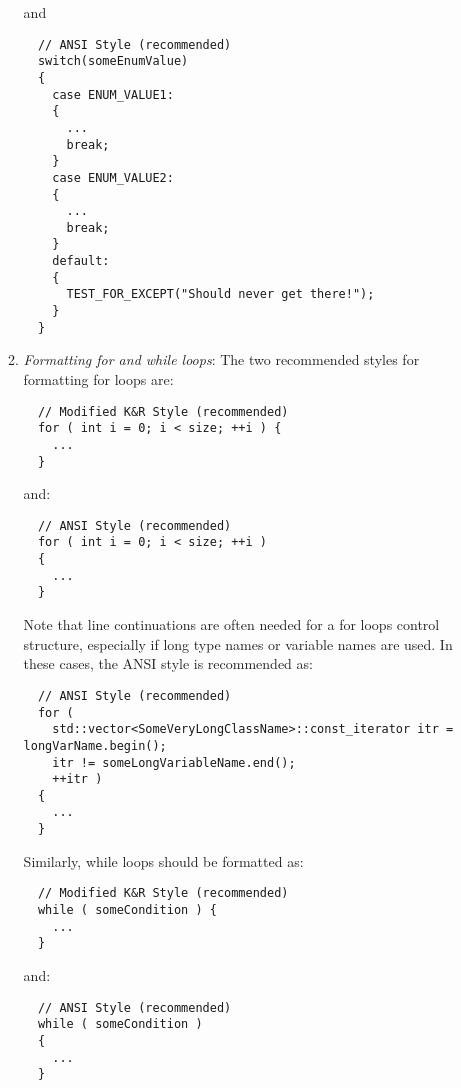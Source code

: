 \begin{enumerate}
\begin{enumerate}
  {}\noindent{}and

  {\small\begin{verbatim}
  // ANSI Style (recommended)
  switch(someEnumValue)
  {
    case ENUM_VALUE1:
    {
      ...
      break;
    }
    case ENUM_VALUE2:
    {
      ...
      break;
    }    
    default:
    {
      TEST_FOR_EXCEPT("Should never get there!");
    }
  }
  \end{verbatim}}

  {}\item\textit{Formatting for and while loops}: The two recommended styles
  for formatting for loops are:

  {\small\begin{verbatim}
  // Modified K&R Style (recommended)
  for ( int i = 0; i < size; ++i ) {
    ...
  }
  \end{verbatim}}

  {}\noindent{}and:

  {\small\begin{verbatim}
  // ANSI Style (recommended)
  for ( int i = 0; i < size; ++i )
  {
    ...
  }
  \end{verbatim}}

  Note that line continuations are often needed for a for loops control
  structure, especially if long type names or variable names are used.  In
  these cases, the ANSI style is recommended as:

  {\small\begin{verbatim}
  // ANSI Style (recommended)
  for (
    std::vector<SomeVeryLongClassName>::const_iterator itr = longVarName.begin();
    itr != someLongVariableName.end();
    ++itr )
  {
    ...
  }
  \end{verbatim}}

  Similarly, while loops should be formatted as:

  {\small\begin{verbatim}
  // Modified K&R Style (recommended)
  while ( someCondition ) {
    ...
  }
  \end{verbatim}}

  {}\noindent{}and:

  {\small\begin{verbatim}
  // ANSI Style (recommended)
  while ( someCondition )
  {
    ...
  }
  \end{verbatim}}

  \end{enumerate}

\end{enumerate}

